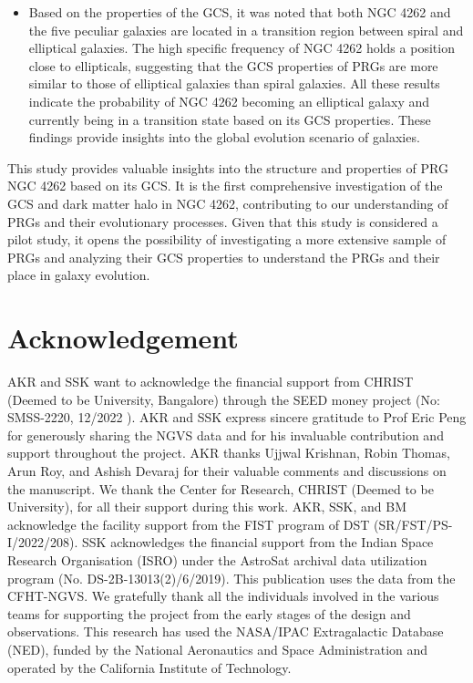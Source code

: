 \documentclass[fleqn,usenatbib]{mnras}
\begin{document}
\begin{itemize}
    \item Based on the properties of the GCS, it was noted that both NGC 4262 and the five peculiar galaxies are located in a transition region between spiral and elliptical galaxies. The high specific frequency of NGC 4262 holds a position close to ellipticals, suggesting that the GCS properties of PRGs are more similar to those of elliptical galaxies than spiral galaxies. All these results indicate the probability of NGC 4262 becoming an elliptical galaxy and currently being in a transition state based on its GCS properties. These findings provide insights into the global evolution scenario of galaxies.
    
\end{itemize}
This study provides valuable insights into the structure and properties of PRG NGC 4262 based on its GCS. It is the first comprehensive investigation of the GCS and dark matter halo in NGC 4262, contributing to our understanding of PRGs and their evolutionary processes. Given that this study is considered a pilot study, it opens the possibility of investigating a more extensive sample of PRGs and analyzing their GCS properties to understand the PRGs and their place in galaxy evolution.

\section{Acknowledgement}
AKR and SSK want to acknowledge the financial support from CHRIST (Deemed to be University, Bangalore) through the SEED money project (No: SMSS-2220, 12/2022 ). AKR and SSK express sincere gratitude to Prof Eric Peng for generously sharing the NGVS data and for his invaluable contribution and support throughout the project.
AKR thanks Ujjwal  Krishnan, Robin Thomas, Arun Roy, and Ashish Devaraj for their valuable comments and discussions on the manuscript.  We thank the Center for Research, CHRIST (Deemed to be University), for all their support during this work. AKR, SSK, and BM acknowledge the facility support from the FIST program of DST (SR/FST/PS-I/2022/208). SSK acknowledges the financial support from the Indian Space Research Organisation (ISRO) under the AstroSat archival data utilization program (No. DS-2B-13013(2)/6/2019). This publication uses the data from the  CFHT-NGVS. We gratefully thank all the individuals involved in the various teams for supporting the project from the early stages of the design and observations. This research has used the NASA/IPAC Extragalactic Database (NED), funded by the National Aeronautics and Space Administration and operated by the California Institute of Technology.
\end{document}
